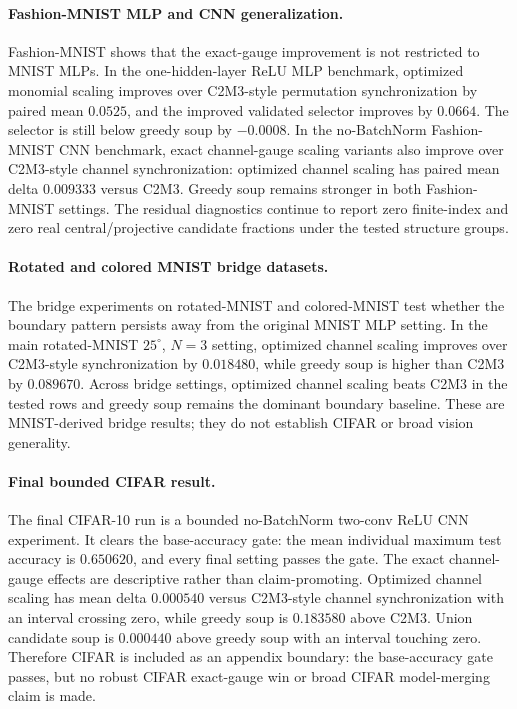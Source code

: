 \paragraph{Fashion-MNIST MLP and CNN generalization.}
Fashion-MNIST shows that the exact-gauge improvement is not restricted to MNIST MLPs. In the one-hidden-layer ReLU MLP benchmark, optimized monomial scaling improves over C2M3-style permutation synchronization by paired mean \(0.0525\), and the improved validated selector improves by \(0.0664\). The selector is still below greedy soup by \(-0.0008\). In the no-BatchNorm Fashion-MNIST CNN benchmark, exact channel-gauge scaling variants also improve over C2M3-style channel synchronization: optimized channel scaling has paired mean delta \(0.009333\) versus C2M3. Greedy soup remains stronger in both Fashion-MNIST settings. The residual diagnostics continue to report zero finite-index and zero real central/projective candidate fractions under the tested structure groups.

\paragraph{Rotated and colored MNIST bridge datasets.}
The bridge experiments on rotated-MNIST and colored-MNIST test whether the boundary pattern persists away from the original MNIST MLP setting. In the main rotated-MNIST \(25^\circ\), \(N=3\) setting, optimized channel scaling improves over C2M3-style synchronization by \(0.018480\), while greedy soup is higher than C2M3 by \(0.089670\). Across bridge settings, optimized channel scaling beats C2M3 in the tested rows and greedy soup remains the dominant boundary baseline. These are MNIST-derived bridge results; they do not establish CIFAR or broad vision generality.

\paragraph{Final bounded CIFAR result.}
The final CIFAR-10 run is a bounded no-BatchNorm two-conv ReLU CNN experiment. It clears the base-accuracy gate: the mean individual maximum test accuracy is \(0.650620\), and every final setting passes the gate. The exact channel-gauge effects are descriptive rather than claim-promoting. Optimized channel scaling has mean delta \(0.000540\) versus C2M3-style channel synchronization with an interval crossing zero, while greedy soup is \(0.183580\) above C2M3. Union candidate soup is \(0.000440\) above greedy soup with an interval touching zero. Therefore CIFAR is included as an appendix boundary: the base-accuracy gate passes, but no robust CIFAR exact-gauge win or broad CIFAR model-merging claim is made.

